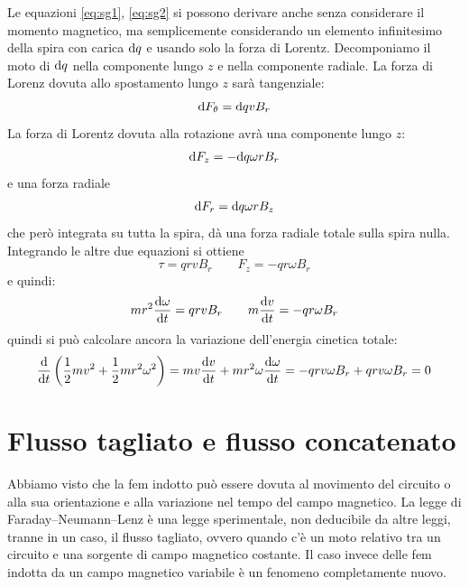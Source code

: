 \begin{Es}
  Le equazioni \eqref{eq:sg1}, \eqref{eq:sg2} si possono derivare anche senza considerare il momento magnetico, ma semplicemente considerando un elemento infinitesimo della spira con carica $\mathrm{d} q$ e usando solo la forza di Lorentz. Decomponiamo il moto di $\mathrm{d} q$ nella componente lungo $z$ e nella componente radiale. La forza di Lorenz dovuta allo spostamento lungo $z$ sarà tangenziale:
  \begin{equation}
    \mathrm{d} F_\theta = \mathrm{d} q v B_r
  \end{equation}
  La forza di Lorentz dovuta alla rotazione avrà una componente lungo $z$:
  \begin{equation}
    \mathrm{d} F_z = -\mathrm{d} q \omega r B_r
  \end{equation}
  e una forza radiale
  \begin{equation}
    \mathrm{d} F_r = \mathrm{d} q \omega r B_z
  \end{equation}
  che però integrata su tutta la spira, dà una forza radiale totale sulla spira nulla. Integrando le altre due equazioni si ottiene
  \begin{equation}
    \tau = q rv B_r \qquad F_z = -q r \omega B_r
  \end{equation}
  e quindi:
  \begin{equation}
  mr^2\frac{\mathrm{d}\omega}{\mathrm{d} t} = q rv B_r\qquad m\frac{\mathrm{d} v}{\mathrm{d} t} = -q r \omega B_r
  \end{equation}
  quindi si può calcolare ancora la variazione dell'energia cinetica totale:
  \begin{equation}
    \frac{\mathrm{d}}{\mathrm{d} t}\left(\frac{1}{2}mv^2+\frac{1}{2}mr^2\omega^2\right) = mv\frac{\mathrm{d} v}{\mathrm{d} t} + mr^2\omega\frac{\mathrm{d}\omega}{\mathrm{d} t} = -q rv \omega B_r+q rv\omega B_r = 0
  \end{equation}
\end{Es}

\section{Flusso tagliato e flusso concatenato}
Abbiamo visto che la fem indotto può essere dovuta al movimento del circuito o alla sua orientazione e alla variazione nel tempo del campo magnetico. La legge di Faraday--Neumann--Lenz è una legge sperimentale, non deducibile da altre leggi, tranne in un caso, il flusso tagliato, ovvero quando c'è un moto relativo tra un circuito e una sorgente di campo magnetico costante. Il caso invece delle fem indotta da un campo magnetico variabile è un fenomeno completamente nuovo.

